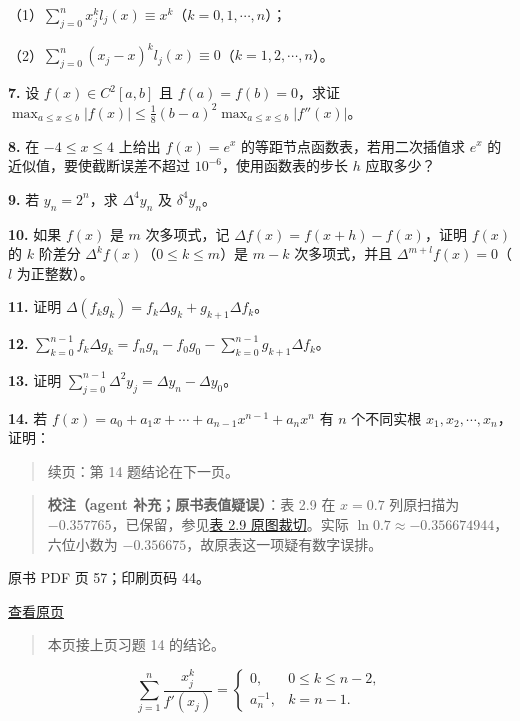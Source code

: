 （1）\(\displaystyle\sum_{j=0}^n x_j^kl_j(x)\equiv x^k\)（\(k=0,1,\cdots,n\)）；

（2）\(\displaystyle\sum_{j=0}^n(x_j-x)^kl_j(x)\equiv0\)（\(k=1,2,\cdots,n\)）。

\textbf{7.} 设 \(f(x)\in C^2[a,b]\) 且 \(f(a)=f(b)=0\)，求证 \(\displaystyle\max_{a\leqslant x\leqslant b}|f(x)|\leqslant\frac18(b-a)^2\max_{a\leqslant x\leqslant b}|f''(x)|\)。

\textbf{8.} 在 \(-4\leqslant x\leqslant4\) 上给出 \(f(x)=e^x\) 的等距节点函数表，若用二次插值求 \(e^x\) 的近似值，要使截断误差不超过 \(10^{-6}\)，使用函数表的步长 \(h\) 应取多少？

\textbf{9.} 若 \(y_n=2^n\)，求 \(\Delta^4y_n\) 及 \(\delta^4y_n\)。

\textbf{10.} 如果 \(f(x)\) 是 \(m\) 次多项式，记 \(\Delta f(x)=f(x+h)-f(x)\)，证明 \(f(x)\) 的 \(k\) 阶差分 \(\Delta^kf(x)\)（\(0\leqslant k\leqslant m\)）是 \(m-k\) 次多项式，并且 \(\Delta^{m+l}f(x)=0\)（\(l\) 为正整数）。

\textbf{11.} 证明 \(\Delta(f_kg_k)=f_k\Delta g_k+g_{k+1}\Delta f_k\)。

\textbf{12.} \(\displaystyle\sum_{k=0}^{n-1}f_k\Delta g_k=f_ng_n-f_0g_0-\sum_{k=0}^{n-1}g_{k+1}\Delta f_k\)。

\textbf{13.} 证明 \(\displaystyle\sum_{j=0}^{n-1}\Delta^2y_j=\Delta y_n-\Delta y_0\)。

\textbf{14.} 若 \(f(x)=a_0+a_1x+\cdots+a_{n-1}x^{n-1}+a_nx^n\) 有 \(n\) 个不同实根 \(x_1,x_2,\cdots,x_n\)，证明：

\begin{quote}
续页：第 14 题结论在下一页。
\end{quote}

\begin{quote}
\textbf{校注（agent 补充；原书表值疑误）}：表 2.9 在 \(x=0.7\) 列原扫描为 \(-0.357765\)，已保留，参见\href{verified/assets/ch02b/table-2-9.png}{表 2.9 原图裁切}。实际 \(\ln0.7\approx-0.356674944\)，六位小数为 \(-0.356675\)，故原表这一项疑有数字误排。
\end{quote}

\clearpage

原书 PDF 页 57；印刷页码 44。

\href{source-images/pdf-057.jpeg}{查看原页}

\begin{quote}
本页接上页习题 14 的结论。
\end{quote}

\[\sum_{j=1}^n\frac{x_j^k}{f'(x_j)}=\begin{cases}0,&0\leqslant k\leqslant n-2,\\a_n^{-1},&k=n-1.\end{cases}\]

